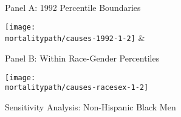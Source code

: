 \documentclass[12pt,letterpaper]{article}
\begin{document}
\begin{figure}[H]
  \caption{Sensitivity Analysis: Non-Hispanic Black Men}
  \begin{center}
    \vspace{-.6cm}
    Panel A: 1992 Percentile Boundaries
  \end{center}
  \vspace{-1.4cm}
  \begin{center}
    \texttt{[image: \\mortalitypath/causes-1992-1-2]} &
  \end{center}

  \begin{center}
    \vspace{-.6cm}
    Panel B: Within Race-Gender Percentiles
  \end{center}
  \vspace{-1.4cm}
  \begin{center}
    \texttt{[image: \\mortalitypath/causes-racesex-1-2]} \\
  \end{center}
\end{figure}
\end{document}
